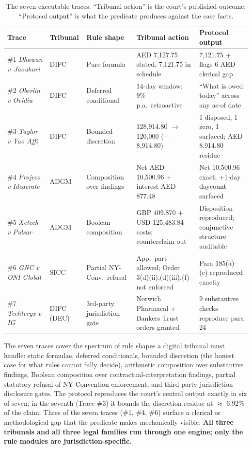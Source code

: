 \documentclass[11pt,letterpaper]{article}
\begin{document}
\begin{table}[h]
\centering
\caption{The seven executable traces. ``Tribunal action'' is the court's published outcome; ``Protocol output'' is what the predicate produces against the case facts.}
\label{tab:traces}
\footnotesize
\begin{tabular}{p{} p{} p{} p{} p{}}
\toprule
\textbf{Trace} & \textbf{Tribunal} & \textbf{Rule shape} & \textbf{Tribunal action} & \textbf{Protocol output} \\
\midrule
\#1 \textit{Dhawan v\ Jaouhari} & DIFC & Pure formula & AED 7{,}127.75 stated; 7{,}121.75 in schedule & 7{,}121.75 + flags 6 AED clerical gap \\
\#2 \textit{Oberlin v Ovidiu} & DIFC & Deferred conditional & 14-day window; 9\% p.a.\ retroactive & ``What is owed today'' across any as-of date \\
\#3 \textit{Taylor v Yao Affi} & DIFC & Bounded discretion & 128{,}914.80 $\to$ 120{,}000 ($-$8{,}914.80) & 1 disposed, 1 zero, 1 surfaced; AED 8{,}914.80 residue \\
\#4 \textit{Projeco v Ideacrate} & ADGM & Composition over findings & Net AED 10{,}500.96 + interest AED 877.48 & Net 10{,}500.96 exact; +1-day daycount surfaced \\
\#5 \textit{Xetech v Pulsar} & ADGM & Boolean composition & GBP 409{,}870 + USD 125{,}483.84 costs; counterclaim out & Disposition reproduced; conjunctive structure auditable \\
\#6 \textit{GNC v ONI Global} & SICC & Partial NY-Conv.\ refusal & App.\ part-allowed; Order 3(d)(ii),(d)(iii),(f) not enforced & Para 185(a)--(c) reproduced exactly \\
\#7 \textit{Techteryx v IG} & DIFC (DEC) & 3rd-party jurisdiction gate & Norwich Pharmacal + Bankers Trust orders granted & 9 substantive checks reproduce para 24 \\
\bottomrule
\end{tabular}
\end{table}

The seven traces cover the spectrum of rule shapes a digital tribunal must handle: static formulae, deferred conditionals, bounded discretion (the honest case for what rules cannot fully decide), arithmetic composition over substantive findings, Boolean composition over contractual-interpretation findings, partial statutory refusal of NY Convention enforcement, and third-party-jurisdiction disclosure gates. The protocol reproduces the court's central output exactly in six of seven; in the seventh (Trace \#3) it bounds the discretion residue at $\approx$ 6.92\% of the claim. Three of the seven traces (\#1, \#4, \#6) surface a clerical or methodological gap that the predicate makes mechanically visible. \textbf{All three tribunals and all three legal families run through one engine; only the rule modules are jurisdiction-specific.}
\end{document}
